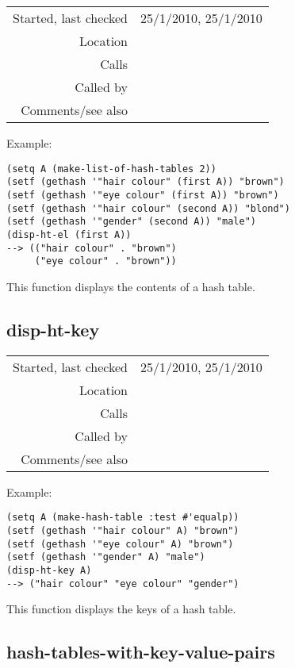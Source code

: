 \vspace{0.3cm}
\begin{tabular}{r|p{8cm}}
Started, last checked & 25/1/2010, 25/1/2010 \\
Location & \nameref{sec:hash-tables} \\
Calls & \\
Called by & \nameref{fun:write-to-file-balanced-hash-table} \\
Comments/see also &
\end{tabular}

\vspace{0.5cm}
\noindent Example:
\begin{verbatim}
(setq A (make-list-of-hash-tables 2))
(setf (gethash '"hair colour" (first A)) "brown")
(setf (gethash '"eye colour" (first A)) "brown")
(setf (gethash '"hair colour" (second A)) "blond")
(setf (gethash '"gender" (second A)) "male")
(disp-ht-el (first A))
--> (("hair colour" . "brown")
     ("eye colour" . "brown"))
\end{verbatim}

\noindent This function displays the contents of a
hash table.


\subsection*{disp-ht-key}\label{fun:disp-ht-key}

\vspace{0.3cm}
\begin{tabular}{r|p{8cm}}
Started, last checked & 25/1/2010, 25/1/2010 \\
Location & \nameref{sec:hash-tables} \\
Calls & \\
Called by & \nameref{fun:write-to-file-balanced-hash-table} \\
Comments/see also &
\end{tabular}

\vspace{0.5cm}
\noindent Example:
\begin{verbatim}
(setq A (make-hash-table :test #'equalp))
(setf (gethash '"hair colour" A) "brown")
(setf (gethash '"eye colour" A) "brown")
(setf (gethash '"gender" A) "male")
(disp-ht-key A)
--> ("hair colour" "eye colour" "gender")
\end{verbatim}

\noindent This function displays the keys of a hash
table.


\subsection*{hash-tables-with-key-value-pairs}\label{fun:hash-tables-with-key-value-pairs}

